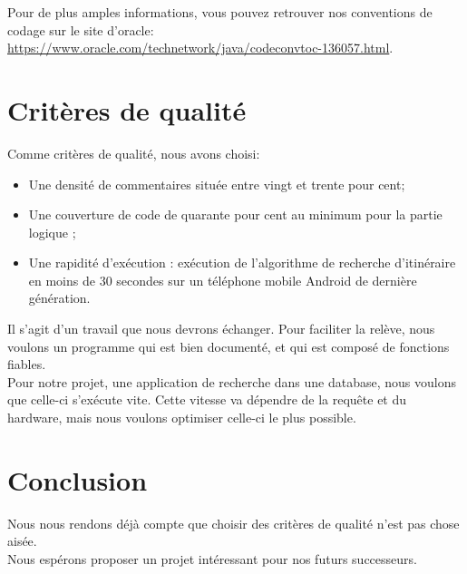 \documentclass[a4paper,11pt]{article}
\begin{document}
\newpage
Pour de plus amples informations, vous pouvez retrouver nos conventions de codage sur le site d'oracle:
\url{https://www.oracle.com/technetwork/java/codeconvtoc-136057.html}.

\section{Critères de qualité}

Comme critères de qualité, nous avons choisi:
\begin{itemize}
  \item Une densité de commentaires située entre vingt et trente pour cent;
  \item Une couverture de code de quarante pour cent au minimum pour la partie \og{} logique \fg{};
  \item Une rapidité d'exécution : exécution de l'algorithme de recherche d'itinéraire en moins de 30 secondes sur un téléphone mobile Android de dernière génération.
\end{itemize}


Il s'agit d'un travail que nous devrons échanger. Pour faciliter la relève, nous voulons un programme qui est bien documenté, et qui est composé de fonctions fiables.\\
Pour notre projet, une application de recherche dans une database, nous voulons que celle-ci s'exécute vite.
Cette vitesse va dépendre de la requête et du hardware, mais nous voulons optimiser celle-ci le plus possible.

\section*{Conclusion}
Nous nous rendons déjà compte que choisir des critères de qualité n'est pas chose aisée.\\
Nous espérons proposer un projet intéressant pour nos futurs successeurs.
\end{document}
